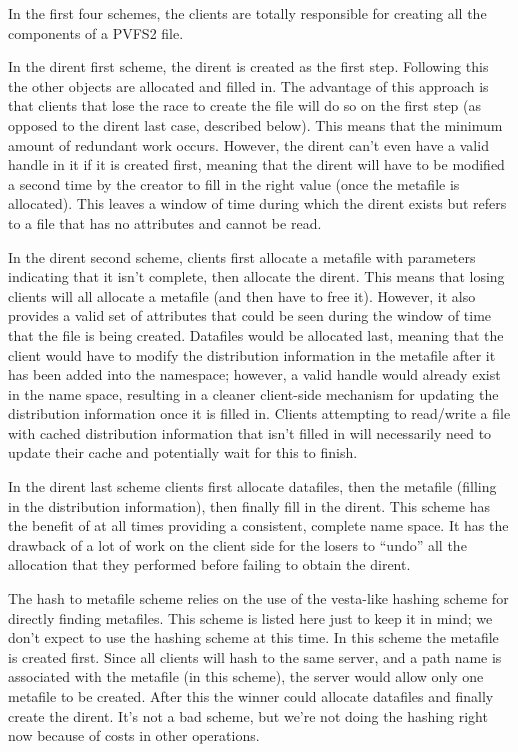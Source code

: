 \documentclass[10pt]{article} %
\begin{document}
In the first four schemes, the clients are totally responsible for creating
all the components of a PVFS2 file.

In the dirent first scheme, the dirent is created as the first step.
Following this the other objects are allocated and filled in.  The advantage
of this approach is that clients that lose the race to create the file will do
so on the first step (as opposed to the dirent last case, described below).
This means that the minimum amount of redundant work occurs.  However, the
dirent can't even have a valid handle in it if it is created first, meaning
that the dirent will have to be modified a second time by the creator to fill
in the right value (once the metafile is allocated).  This leaves a window of
time during which the dirent exists but refers to a file that has no
attributes and cannot be read.

In the dirent second scheme, clients first allocate a metafile with parameters
indicating that it isn't complete, then allocate the dirent.  This means that
losing clients will all allocate a metafile (and then have to free it).
However, it also provides a valid set of attributes that could be seen during
the window of time that the file is being created.  Datafiles would be
allocated last, meaning that the client would have to modify the distribution
information in the metafile after it has been added into the namespace;
however, a valid handle would already exist in the name space, resulting in a
cleaner client-side mechanism for updating the distribution information once
it is filled in.  Clients attempting to read/write a file with cached
distribution information that isn't filled in will necessarily need to update
their cache and potentially wait for this to finish.

In the dirent last scheme clients first allocate datafiles, then the metafile
(filling in the distribution information), then finally fill in the dirent.
This scheme has the benefit of at all times providing a consistent, complete
name space.  It has the drawback of a lot of work on the client side for the
losers to ``undo'' all the allocation that they performed before failing to
obtain the dirent.

The hash to metafile scheme relies on the use of the vesta-like hashing scheme
for directly finding metafiles.  This scheme is listed here just to keep it in
mind; we don't expect to use the hashing scheme at this time.  In this scheme
the metafile is created first.  Since all clients will hash to the same
server, and a path name is associated with the metafile (in this scheme), the
server would allow only one metafile to be created.  After this the winner
could allocate datafiles and finally create the dirent.  It's not a bad
scheme, but we're not doing the hashing right now because of costs in other
operations.
\end{document}

